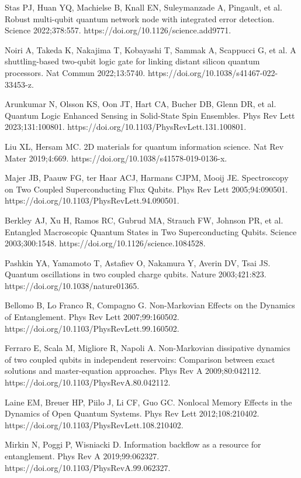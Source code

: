 \documentclass[
showpacs,  %
showkeys,  %
aps,       %
amsthm,    %
amsmath,   %
amsfonts,  %
amssymb    %
]{revtex4-1}          %
\begin{document}
\begin{thebibliography}{}
Stas PJ, Huan YQ, Machielse B, Knall EN, Suleymanzade A, Pingault, et al. Robust multi-qubit quantum network node with integrated error detection. Science 2022;378:557. https://doi.org/10.1126/science.add9771.

Noiri A, Takeda K, Nakajima T, Kobayashi T, Sammak A, Scappucci G, et al. A shuttling-based two-qubit logic gate for linking distant silicon quantum processors. Nat Commun 2022;13:5740. https://doi.org/10.1038/s41467-022-33453-z.

Arunkumar N, Olsson KS, Oon JT, Hart CA, Bucher DB, Glenn DR, et al. Quantum Logic Enhanced Sensing in Solid-State Spin Ensembles. Phys Rev Lett 2023;131:100801. https://doi.org/10.1103/PhysRevLett.131.100801.

Liu XL, Hersam MC. 2D materials for quantum information science. Nat Rev Mater 2019;4:669. https://doi.org/10.1038/s41578-019-0136-x.

Majer JB, Paauw FG, ter Haar ACJ, Harmans CJPM, Mooij JE. Spectroscopy on Two Coupled Superconducting Flux Qubits. Phys Rev Lett 2005;94:090501. https://doi.org/10.1103/PhysRevLett.94.090501.

Berkley AJ, Xu H, Ramos RC, Gubrud MA, Strauch FW, Johnson PR, et al. Entangled Macroscopic Quantum States in Two Superconducting Qubits. Science 2003;300:1548. https://doi.org/10.1126/science.1084528.

Pashkin YA, Yamamoto T, Astafiev O, Nakamura Y, Averin DV, Tsai JS. Quantum oscillations in two coupled charge qubits. Nature 2003;421:823. https://doi.org/10.1038/nature01365.

Bellomo B, Lo Franco R, Compagno G. Non-Markovian Effects on the Dynamics of Entanglement. Phys Rev Lett 2007;99:160502. https://doi.org/10.1103/PhysRevLett.99.160502.

Ferraro E, Scala M, Migliore R, Napoli A. Non-Markovian dissipative dynamics of two coupled qubits in independent reservoirs: Comparison between exact solutions and master-equation approaches. Phys Rev A 2009;80:042112. https://doi.org/10.1103/PhysRevA.80.042112.

Laine EM, Breuer HP, Piilo J, Li CF, Guo GC. Nonlocal Memory Effects in the Dynamics of Open Quantum Systems. Phys Rev Lett 2012;108:210402. https://doi.org/10.1103/PhysRevLett.108.210402.

Mirkin N, Poggi P, Wisniacki D. Information backflow as a resource for entanglement. Phys Rev A 2019;99:062327. https://doi.org/10.1103/PhysRevA.99.062327.


\end{thebibliography}
\end{document}
